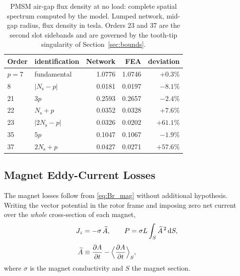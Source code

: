\documentclass[10pt,a4paper,twocolumn]{article}
\theoremstyle{plain}
\theoremstyle{remark}
\begin{document}
\begin{table}[!t]
\centering
\footnotesize
\begin{tabular}{llrrr}
\toprule
Order & identification & Network & FEA & deviation \\
\midrule
$p=7$  & fundamental                      & 1.0776 & 1.0746 & $+0.3\%$ \\
8      & $|N_{\mathrm{s}}-p|$             & 0.0181 & 0.0197 & $-8.1\%$ \\
21     & $3p$                             & 0.2593 & 0.2657 & $-2.4\%$ \\
22     & $N_{\mathrm{s}}+p$               & 0.0352 & 0.0328 & $+7.6\%$ \\
23     & $|2N_{\mathrm{s}}-p|$            & 0.0326 & 0.0202 & $+61.1\%$ \\
35     & $5p$                             & 0.1047 & 0.1067 & $-1.9\%$ \\
37     & $2N_{\mathrm{s}}+p$              & 0.0427 & 0.0271 & $+57.6\%$ \\
\bottomrule
\end{tabular}
\caption{PMSM air-gap flux density at no load: complete spatial spectrum
computed by the model. Lumped network, mid-gap radius, flux density in
tesla. Orders 23 and 37 are the second slot sidebands and are governed
by the tooth-tip singularity of Section~\ref{sec:bounds}.}
\label{tab:spectrum}
\end{table}

\subsection{Magnet Eddy-Current Losses}
\label{sub:pmloss}

The magnet losses follow from \eqref{eq:Br_mag} without additional
hypothesis. Writing the vector potential in the rotor frame and imposing
zero net current over the \emph{whole} cross-section of each magnet,
\begin{equation}
\begin{aligned}
J_z &= -\sigma\,\widetilde{A},
\qquad
P = \sigma L \int_S \widetilde{A}^{\,2}\,\mathrm{d}S ,\\[1ex]
\widetilde{A} &\equiv \frac{\partial A}{\partial t}
- \Bigl\langle \frac{\partial A}{\partial t}\Bigr\rangle_{S},
\end{aligned}
\label{eq:pmloss}
\end{equation}
where $\sigma$ is the magnet conductivity and $S$ the magnet section.
\end{document}
